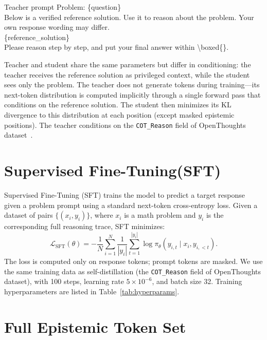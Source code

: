 \documentclass[11pt]{article}
\begin{document}
\begin{promptbox}{Teacher prompt}
Problem: \textcolor{PromptVar}{\{question\}}\\[3pt]
Below is a verified reference solution. Use it to reason about the problem. Your own response wording may differ.\\[3pt]
\textcolor{PromptVar}{\{reference\_solution\}}\\[3pt]
Please reason step by step, and put your final answer within \textbackslash boxed\{\}.
\end{promptbox}

Teacher and student share the same parameters but differ in conditioning: the teacher receives the reference solution as privileged context, while the student sees only the problem. The teacher does not generate tokens during training---its next-token distribution is computed implicitly through a single forward pass that conditions on the reference solution. The student then minimizes its KL divergence to this distribution at each position (except masked epistemic positions). The teacher conditions on the \texttt{COT\_Reason} field of OpenThoughts dataset~\cite{guha2025openthoughts}.

\section{Supervised Fine-Tuning(SFT)}

Supervised Fine-Tuning (SFT) trains the model to predict a target response given a problem prompt using a standard next-token cross-entropy loss.
Given a dataset of pairs $\{(x_i, y_i)\}$, where $x_i$ is a math problem and $y_i$ is the corresponding full reasoning trace, SFT minimizes:
\[
\mathcal{L}_{\text{SFT}}(\theta) = -\frac{1}{N}\sum_{i=1}^N \frac{1}{|y_i|}\sum_{t=1}^{|y_i|} \log \pi_\theta(y_{i,t} \mid x_i, y_{i,<t}).
\]
The loss is computed only on response tokens; prompt tokens are masked.
We use the same training data as self-distillation (the \texttt{COT\_Reason} field of OpenThoughts dataset), with 100 steps, learning rate $5 \times 10^{-6}$, and batch size 32.
Training hyperparameters are listed in Table~\ref{tab:hyperparams}.


\section{Full Epistemic Token Set}
\label{app:epi_set}
\end{document}
